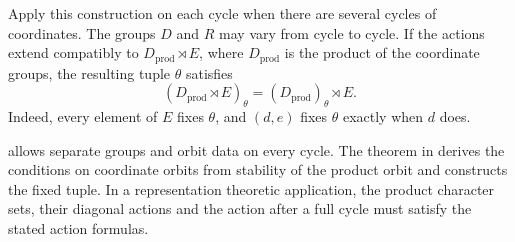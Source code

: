Apply this construction on each cycle when there are several cycles
of coordinates. The groups $D$ and $R$ may vary from cycle to cycle.
If the actions extend compatibly to $D_{\mathrm{prod}}\rtimes E$,
where $D_{\mathrm{prod}}$ is the product of the coordinate groups,
the resulting tuple $\theta$ satisfies
\[
 (D_{\mathrm{prod}}\rtimes E)_\theta
   =(D_{\mathrm{prod}})_\theta\rtimes E.
\]
Indeed, every element of $E$ fixes $\theta$, and $(d,e)$ fixes
$\theta$ exactly when $d$ does.

\begin{implementation}
 allows separate groups and
orbit data on every cycle.
The theorem  in
derives the conditions on coordinate orbits from stability of the
product orbit and constructs the fixed tuple.
In a representation theoretic application, the product character
sets, their diagonal actions and the action after a full cycle must
satisfy the stated action formulas.
\end{implementation}
